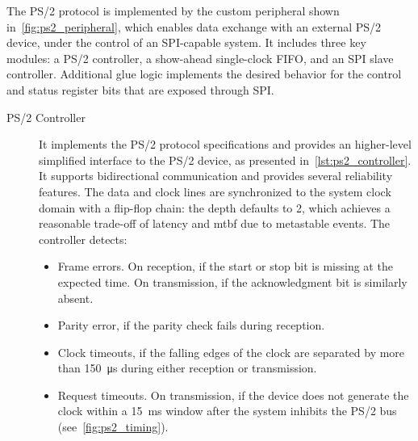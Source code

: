 \documentclass[]{article}
\begin{document}
The PS/2 protocol is implemented by the custom peripheral shown in~\cref{fig:ps2_peripheral}, which enables data exchange with an external PS/2 device, under the control of an SPI-capable system. It includes three key modules: a PS/2 controller, a show-ahead single-clock FIFO, and an SPI slave controller. Additional glue logic implements the desired behavior for the control and status register bits that are exposed through SPI.

\begin{description}
    \item[PS/2 Controller] It implements the PS/2 protocol specifications and provides an higher-level simplified interface to the PS/2 device, as presented in~\cref{lst:ps2_controller}. It supports bidirectional communication and provides several reliability features. The data and clock lines are synchronized to the system clock domain with a flip-flop chain: the depth defaults to 2, which achieves a reasonable trade-off of latency and \ac{mtbf} due to metastable events. The controller detects:
    \begin{itemize}
        \item Frame errors. On reception, if the start or stop bit is missing at the expected time. On transmission, if the acknowledgment bit is similarly absent.
        \item Parity error, if the parity check fails during reception.
        \item Clock timeouts, if the falling edges of the clock are separated by more than \qty{150}{\micro\s} during either reception or transmission.
        \item Request timeouts. On transmission, if the device does not generate the clock within a \qty{15}{\milli\s} window after the system inhibits the PS/2 bus (see~\cref{fig:ps2_timing}).
    \end{itemize}
    

\end{description}
\end{document}
